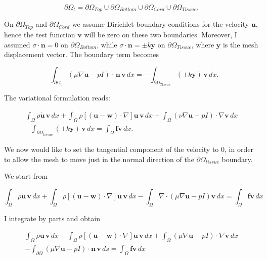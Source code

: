 \documentclass[11pt,a4paper,titlepage]{report}
\begin{document}
\[
\partial \Omega_t= \partial \Omega_{Top} \cup \partial \Omega_{Bottom} \cup \partial \Omega_{Cord} \cup  \partial \Omega_{Tissue}.
\]

On $\partial \Omega_{Top}$ and $\partial \Omega_{Cord}$ we assume Dirichlet boundary conditions for the velocity $\mathbf{u}$, hence the test function $\mathbf{v}$ will be zero on these two boundaries. Moreover, I assumed $\sigma \cdot \mathbf{n} = 0$ on $\partial \Omega_{Bottom}$, while $\sigma \cdot \mathbf{n} = \pm k \mathbf{y} $ on $\partial \Omega_{Tissue}$, where $\mathbf{y}$ is the mesh displacement vector. The boundary term becomes

\[
- \int_{\partial \Omega_t} (\mu \nabla \mathbf{u} - p I) \cdot \, \mathbf{n} \, \mathbf{v} \, dx = - \int_{\partial \Omega_{Tissue}} (\pm k \mathbf{y}) \, \mathbf{v} \, dx.
\]

The variational formulation reads:

\begin{align*}
\int_{\Omega} \rho \dot{\mathbf{u}} \, \mathbf{v} \, dx
+ \int_{\Omega} \rho [(\mathbf{u - w}) \cdot \nabla] \mathbf{u} \, \mathbf{v} \, dx
+ \int_{\Omega} (\nu \nabla \mathbf{u} - pI) \cdot \nabla \mathbf{v} \, dx \\
- \int_{\partial \Omega_{tissue}} (\pm k \mathbf{y}) \, \mathbf{v} \, dx
=  \int_{\Omega} \mathbf{f} \mathbf{v} \, dx.
\end{align*}

We now would like to set the tangential component of the velocity to $0$, in order to allow the mesh to move just in the normal direction of the $\partial \Omega_{tissue}$ boundary.


We start from 

\[
 \int_{\Omega} \rho \dot{\mathbf{u}} \, \mathbf{v} \, dx
+ \int_{\Omega} \rho [(\mathbf{u - w}) \cdot \nabla] \mathbf{u} \, \mathbf{v} \, dx
- \int_{\Omega} \nabla \cdot (\mu \nabla \mathbf{u} - pI)\mathbf{v} \, dx
= \int_{\Omega} \mathbf{f} \mathbf{v} \, dx
\]

I integrate by parts and obtain 

\begin{align*}
 \int_{\Omega} \rho \dot{\mathbf{u}} \, \mathbf{v} \, dx
+ \int_{\Omega} \rho [(\mathbf{u - w}) \cdot \nabla] \mathbf{u} \, \mathbf{v} \, dx
+ \int_{\Omega} (\mu \nabla \mathbf{u} - pI) \cdot \nabla \mathbf{v} \, dx \\
- \int_{\partial \Omega} (\mu \nabla \mathbf{u} - pI) \cdot \mathbf{n} \, \mathbf{v} \, ds
= \int_{\Omega} \mathbf{f} \mathbf{v} \, dx
\end{align*}
\end{document}
